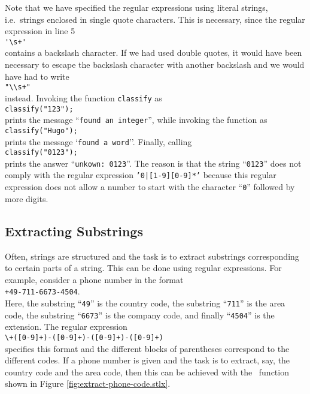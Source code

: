 Note that we have specified the regular expressions
using literal strings, i.e.~strings enclosed in single quote characters. This is necessary,
since the regular expression in line 5 \\[0.2cm]
\hspace*{1.3cm}
\verb|'\s+'|
\\[0.2cm]
contains a backslash character.  If we had used double quotes, it would have been
necessary to escape the backslash character with another backslash and we would have had
to write
\\[0.2cm]
\hspace*{1.3cm}
\verb|"\\s+"|
\\[0.2cm]
instead.  Invoking the function \texttt{classify} as 
\\[0.2cm]
\hspace*{1.3cm}
\texttt{classify("123");}
\\[0.2cm]
 prints the message ``\texttt{found an integer}'', while invoking the function as
\\[0.2cm]
\hspace*{1.3cm}
\texttt{classify("Hugo");}
\\[0.2cm]
prints the message `\texttt{found a word}''.  Finally, calling
\\[0.2cm]
\hspace*{1.3cm}
\texttt{classify("0123");}
\\[0.2cm]
prints the answer ``\texttt{unkown: 0123}''.  The reason is that the string
``\texttt{0123}'' does not comply with the regular expression \texttt{'0|[1-9][0-9]*'} because this
regular expression does not allow a number to start with the character ``\texttt{0}'' followed by
more digits.  


\subsection{Extracting Substrings}
Often,  strings are structured and the task is to extract substrings corresponding to
certain parts of a string.  This can be done using regular expressions.  For 
example, consider a phone number in the format
\\[0.2cm]
\hspace*{1.3cm}
\texttt{+49-711-6673-4504}.
\\[0.2cm]
Here, the substring ``\texttt{49}'' is the country code, the substring ``\texttt{711}'' is
the area code, the substring ``\texttt{6673}'' is the company code, and finally
``\texttt{4504}'' is the extension.  The regular expression 
\\[0.2cm]
\hspace*{1.3cm}
\verb|\+([0-9]+)-([0-9]+)-([0-9]+)-([0-9]+)|
\\[0.2cm]
specifies this format and the different blocks of parentheses correspond to the different
codes. If  a phone number is given and the task is to
extract, say, the country code and the area code, then this can be achieved with the 
\setlx\ function shown in Figure \ref{fig:extract-phone-code.stlx}.

